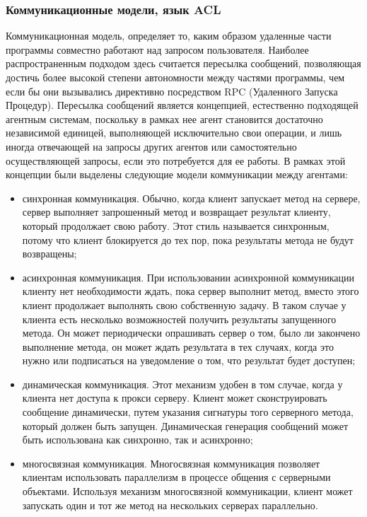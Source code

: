 \subsubsection{Коммуникационные модели, язык ACL}
Коммуникационная модель, определяет то, каким образом удаленные части программы совместно работают над запросом пользователя. Наиболее распространенным подходом здесь считается пересылка сообщений, позволяющая достичь более высокой степени автономности между частями программы, чем если бы они вызывались директивно посредством RPC (Удаленного Запуска Процедур). Пересылка сообщений является концепцией, естественно подходящей агентным системам, поскольку в рамках нее агент становится достаточно независимой единицей, выполняющей исключительно свои операции, и лишь иногда отвечающей на запросы других агентов или самостоятельно осуществляющей запросы, если это потребуется для ее работы. В рамках этой концепции были выделены следующие модели коммуникации между агентами:
\begin{itemize}
\item синхронная коммуникация. Обычно, когда клиент запускает метод на сервере, сервер выполняет запрошенный метод и возвращает результат клиенту, который продолжает свою работу. Этот стиль называется синхронным, потому что клиент блокируется до тех пор, пока результаты метода не будут возвращены;
\item асинхронная коммуникация. При использовании асинхронной коммуникации клиенту нет необходимости ждать, пока сервер выполнит метод, вместо этого клиент продолжает выполнять свою собственную задачу. В таком случае у клиента есть несколько возможностей получить результаты запущенного метода. Он может периодически опрашивать сервер о том, было ли закончено выполнение метода, он может ждать результата в тех случаях, когда это нужно или подписаться на уведомление о том, что результат будет доступен;
\item динамическая коммуникация. Этот механизм удобен в том случае, когда у клиента нет доступа к прокси серверу. Клиент может сконструировать сообщение динамически, путем указания сигнатуры того серверного метода, который должен быть запущен. Динамическая генерация сообщений может быть использована как синхронно, так и асинхронно;
\item многосвязная коммуникация. Многосвязная коммуникация позволяет клиентам использовать параллелизм в процессе общения с серверными объектами. Используя механизм многосвязной коммуникации, клиент может запускать один и тот же метод на нескольких серверах параллельно.
\end{itemize}

